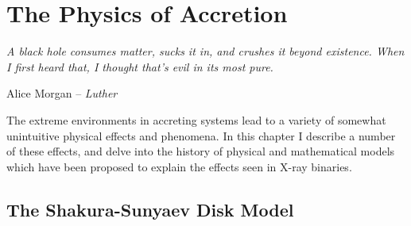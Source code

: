 \chapter{The Physics of Accretion}

\label{sec:PhysAcc}

\epigraph{\textit{A black hole consumes matter, sucks it in, and crushes it beyond existence. When I first heard that, I thought that's evil in its most pure.}}{Alice Morgan -- \textit{Luther}}

\vspace{1cm}

\par\noindent The extreme environments in accreting systems lead to a variety of somewhat unintuitive physical effects and phenomena.  In this chapter I describe a number of these effects, and delve into the history of physical and mathematical models which have been proposed to explain the effects seen in X-ray binaries.

\section{The Shakura-Sunyaev Disk Model}

